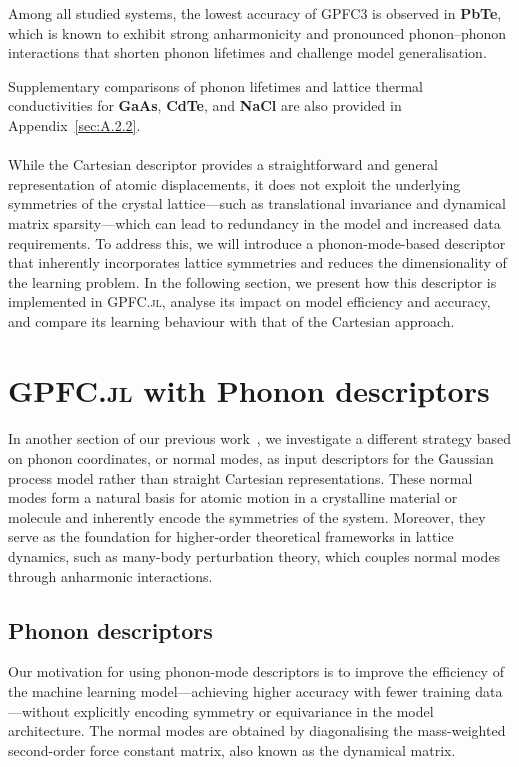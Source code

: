 Among all studied systems, the lowest accuracy of GPFC3 is observed in \textbf{PbTe}, which is known to exhibit strong anharmonicity and pronounced phonon–phonon interactions that shorten phonon lifetimes and challenge model generalisation.

Supplementary comparisons of phonon lifetimes and lattice thermal conductivities for \textbf{GaAs}, \textbf{CdTe}, and \textbf{NaCl} are also provided in Appendix~\ref{sec:A.2.2}.

\paragraph{}
While the Cartesian descriptor provides a straightforward and general representation of atomic displacements, it does not exploit the underlying symmetries of the crystal lattice—such as translational invariance and dynamical matrix sparsity—which can lead to redundancy in the model and increased data requirements. To address this, we will introduce a phonon-mode-based descriptor that inherently incorporates lattice symmetries and reduces the dimensionality of the learning problem.
In the following section, we present how this descriptor is implemented in \textsc{GPFC.jl}, analyse its impact on model efficiency and accuracy, and compare its learning behaviour with that of the Cartesian approach.

\section{\textsc{GPFC.jl} with Phonon descriptors} \label{sec:3.2}
\paragraph{}
In another section of our previous work~\cite{https://doi.org/10.48550/arxiv.2405.05113}, we investigate a different strategy based on phonon coordinates, or normal modes, as input descriptors for the Gaussian process model rather than straight Cartesian representations.
These normal modes form a natural basis for atomic motion in a crystalline material or molecule and inherently encode the symmetries of the system.
Moreover, they serve as the foundation for higher-order theoretical frameworks in lattice dynamics, such as many-body perturbation theory, which couples normal modes through anharmonic interactions.

\subsection{Phonon descriptors} \label{subsec:3.2.1}
Our motivation for using phonon-mode descriptors is to improve the efficiency of the machine learning model—achieving higher accuracy with fewer training data—without explicitly encoding symmetry or equivariance in the model architecture. The normal modes are obtained by diagonalising the mass-weighted second-order force constant matrix, also known as the dynamical matrix.

